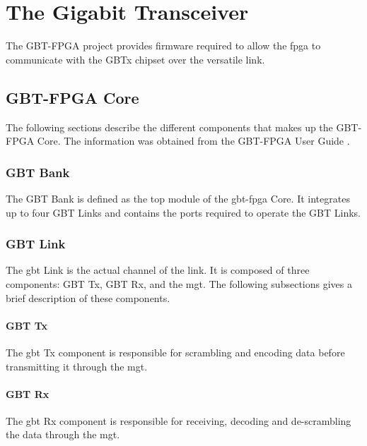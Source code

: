 \documentclass[main.tex]{subfiles}
\begin{document}
\chapter{The Gigabit Transceiver} \label{chap:gbt}


The GBT-FPGA project provides firmware required to allow the \gls{fpga} to communicate with the GBTx chipset over the versatile link.

\section{GBT-FPGA Core}
The following sections describe the different components that makes up the GBT-FPGA Core. The information was obtained from the GBT-FPGA User Guide \cite{gbt_fpga}.

\subsection{GBT Bank}
The GBT Bank is defined as the top module of the \gls{gbt}-\gls{fpga} Core. It integrates up to four GBT Links and contains the ports required to operate the GBT Links.

\subsection{GBT Link}
The \gls{gbt} Link is the actual channel of the link. It is composed of three components: GBT Tx, GBT Rx, and the \gls{mgt}. The following subsections gives a brief description of these components.

\subsubsection{GBT Tx}

The \gls{gbt} Tx component is responsible for scrambling and encoding data before transmitting it through the \gls{mgt}.

\subsubsection{GBT Rx}

The \gls{gbt} Rx component is responsible for receiving, decoding and de-scrambling the data through the \gls{mgt}.
\end{document}
